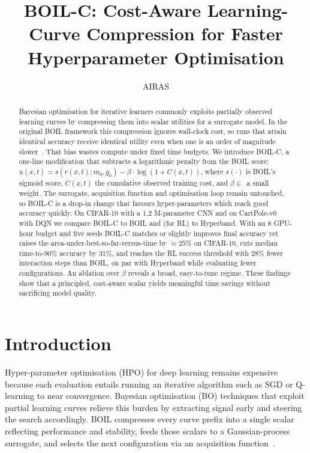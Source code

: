 \documentclass{article} %
\title{BOIL-C\@: Cost-Aware Learning-Curve Compression for Faster Hyperparameter Optimisation}
\author{AIRAS}
\begin{document}
\maketitle

\begin{abstract}
Bayesian optimisation for iterative learners commonly exploits partially observed learning curves by compressing them into scalar utilities for a surrogate model. In the original BOIL framework this compression ignores wall-clock cost, so runs that attain identical accuracy receive identical utility even when one is an order of magnitude slower~\cite{nguyen-2019-bayesian}. That bias wastes compute under fixed time budgets. We introduce BOIL-C, a one-line modification that subtracts a logarithmic penalty from the BOIL score: \(u(x,t)=s(r(x,t);m_0,g_0)-\beta\cdot\log(1+C(x,t))\), where \(s(\cdot)\) is BOIL's sigmoid score, \(C(x,t)\) the cumulative observed training cost, and \(\beta\in\)~a small weight. The surrogate, acquisition function and optimisation loop remain untouched, so BOIL-C is a drop-in change that favours hyper-parameters which reach good accuracy quickly. On CIFAR-10 with a 1.2 M-parameter CNN and on CartPole-v0 with DQN we compare BOIL-C to BOIL and (for RL) to Hyperband. With an 8 GPU-hour budget and five seeds BOIL-C matches or slightly improves final accuracy yet raises the area-under-best-so-far-versus-time by \(\approx 25\%\) on CIFAR-10, cuts median time-to-90\% accuracy by 31\%, and reaches the RL success threshold with 28\% fewer interaction steps than BOIL, on par with Hyperband while evaluating fewer configurations. An ablation over \(\beta\) reveals a broad, easy-to-tune regime. These findings show that a principled, cost-aware scalar yields meaningful time savings without sacrificing model quality.
\end{abstract}

\section{Introduction}\label{sec:intro}%
Hyper-parameter optimisation (HPO) for deep learning remains expensive because each evaluation entails running an iterative algorithm such as SGD or Q-learning to near convergence. Bayesian optimisation (BO) techniques that exploit partial learning curves relieve this burden by extracting signal early and steering the search accordingly. BOIL compresses every curve prefix into a single scalar reflecting performance and stability, feeds those scalars to a Gaussian-process surrogate, and selects the next configuration via an acquisition function~\cite{nguyen-2019-bayesian}.
\end{document}
